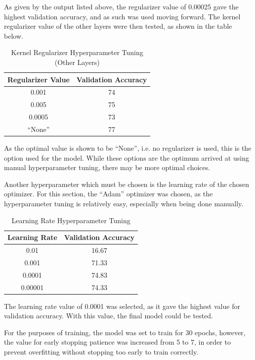 As given by the output listed above, the regularizer value of 0.00025 gave the
highest validation accuracy, and as such was used moving forward. The kernel
regularizer value of the other layers were then tested, as shown in the table
below.

\begin{table}[H]
	\centering
	\caption{Kernel Regularizer Hyperparameter Tuning (Other Layers)}
	\label{tab:krhypo}
	\begin{tabular}{|c|c|}
	\hline
	Regularizer Value & Validation Accuracy \\
	\hline
	0.001 & 74 \\
	0.005 & 75 \\
	0.0005 & 73 \\
	``None'' & 77 \\
	\hline
	\end{tabular}
\end{table}

As the optimal value is shown to be ``None'', i.e. no regularizer is used, this
is the option used for the model. While these options are the optimum arrived at
using manual hyperparameter tuning, there may be more optimal choices.

Another hyperparameter which must be chosen is the learning rate of the chosen
optimizer. For this section, the ``Adam'' optimizer was chosen, as the
hyperparameter tuning is relatively easy, especially when being done manually.

\begin{table}[H]
	\centering
	\caption{Learning Rate Hyperparameter Tuning}
	\label{tab:lrhyp}
	\begin{tabular}{|c|c|}
	\hline
	Learning Rate & Validation Accuracy \\
	\hline
	0.01 & 16.67 \\
	0.001 & 71.33 \\
	0.0001 & 74.83 \\
	0.00001 & 74.33 \\
	\hline
	\end{tabular}
\end{table}

The learning rate value of 0.0001 was selected, as it gave the highest value for
validation accuracy. With this value, the final model could be tested.

For the purposes of training, the model was set to train for 30 epochs, however,
the value for early stopping patience was increased from 5 to 7, in order to
prevent overfitting without stopping too early to train correctly.

